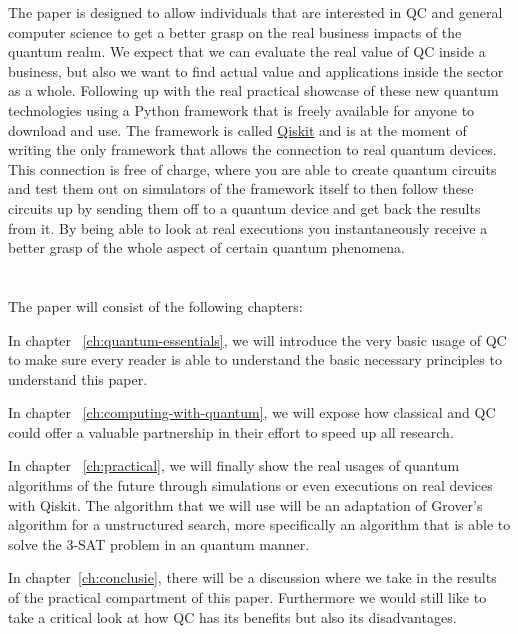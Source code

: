 The paper is designed to allow individuals that are interested in QC and general computer science  to get a better grasp on the real business impacts of the quantum realm. We expect that we can evaluate the real value of QC inside a business, but also we want to find actual value and applications inside the sector as a whole. Following up with the real practical showcase of these new quantum technologies using a Python framework that is freely available for anyone to download and use. The framework is called \href{https://qiskit.org/}{Qiskit} and is at the moment of writing the only framework that allows the connection to real quantum devices. This connection is free of charge, where you are able to create quantum circuits and test them out on simulators of the framework  itself to then follow these circuits up by sending them off to a quantum device and get back the results from it. By being able to look at real executions you instantaneously receive a better grasp of the whole aspect of certain quantum phenomena.

\section{}
\label{sec:opzet-bachelorproef}

The paper will consist of the following chapters:

In chapter ~\ref{ch:quantum-essentials}, we will introduce the very basic usage of QC to make sure every reader is able to understand the basic necessary principles to understand this paper.

In chapter ~\ref{ch:computing-with-quantum}, we will expose how classical and QC could offer a valuable partnership in their effort to speed up all research. 

In chapter ~\ref{ch:practical}, we will finally show the real usages of quantum algorithms of the future through simulations or even executions on real devices with Qiskit. The algorithm that we will use will be an adaptation of Grover's algorithm for a unstructured search, more specifically an algorithm that is able to solve the 3-SAT problem in an quantum manner.

In chapter~\ref{ch:conclusie}, there will be a discussion where we take in the results of the practical compartment of this paper. Furthermore we would still like to take a critical look at how QC has its benefits but also its disadvantages. 